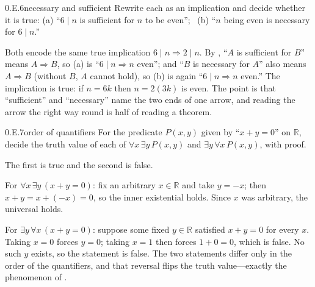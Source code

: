 \documentclass[main.tex]{subfiles}
\begin{document}
\begin{Exercise}{0.E.6}{necessary and sufficient}
Rewrite each as an implication and decide whether it is true: (a) ``$6\mid n$ is sufficient for $n$ to
be even''; \ (b) ``$n$ being even is necessary for $6\mid n$.''
\end{Exercise}
\begin{Solution}
Both encode the same true implication $6\mid n\Rightarrow 2\mid n$. By , ``$A$ is
sufficient for $B$'' means $A\Rightarrow B$, so (a) is ``$6\mid n\Rightarrow n$ even''; and ``$B$ is
necessary for $A$'' also means $A\Rightarrow B$ (without $B$, $A$ cannot hold), so (b) is again
``$6\mid n\Rightarrow n$ even.'' The implication is true: if $n=6k$ then $n=2(3k)$ is even. The point
is that ``sufficient'' and ``necessary'' name the two ends of one arrow, and reading the arrow the
right way round is half of reading a theorem.
\end{Solution}

\par\bigskip{}\par\nobreak\smallskip

\begin{Exercise}{0.E.7}{order of quantifiers}
For the predicate $P(x,y)$ given by ``$x+y=0$'' on $\mathbb R$, decide the truth value of each of
$\forall x\,\exists y\,P(x,y)$ and $\exists y\,\forall x\,P(x,y)$, with proof.
\end{Exercise}
\begin{Solution}
The first is true and the second is false.

For $\forall x\,\exists y\,(x+y=0)$: fix an arbitrary $x\in\mathbb R$ and take $y=-x$; then
$x+y=x+(-x)=0$, so the inner existential holds. Since $x$ was arbitrary, the universal holds.

For $\exists y\,\forall x\,(x+y=0)$: suppose some fixed $y\in\mathbb R$ satisfied $x+y=0$ for every
$x$. Taking $x=0$ forces $y=0$; taking $x=1$ then forces $1+0=0$, which is false. No such $y$ exists,
so the statement is false. The two statements differ only in the order of the quantifiers, and that
reversal flips the truth value---exactly the phenomenon of .
\end{Solution}
\end{document}
